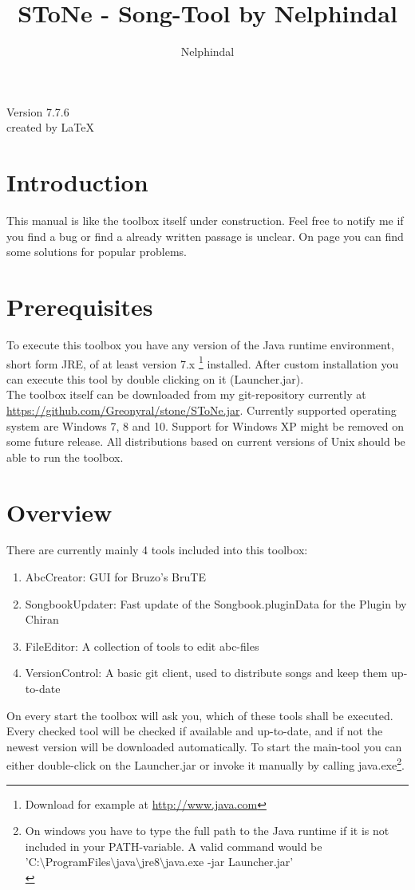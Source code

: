 \documentclass[10pt,a4paper,oneside]{article}
\author{Nelphindal}
\title{SToNe - Song-Tool by Nelphindal}
\begin{document}
\maketitle
Version 7.7.6\\
\vfill
created by \LaTeX
\newpage

\tableofcontents
\newpage

\section{Introduction}
This manual is like the toolbox itself under construction. Feel free to notify me if you find a bug or find a already written passage is unclear. On page \pageref{Trouble} you can find some solutions for popular problems.

\section{Prerequisites}
\label{Preq}
To execute this toolbox you have any version of the Java runtime environment, short form JRE, of at least version 7.x \footnote{Download for example at \url{http://www.java.com}} installed. After custom installation you can execute this tool by double clicking on it (Launcher.jar). \\
The toolbox itself can be downloaded from my git-repository
currently at \url{https://github.com/Greonyral/stone/SToNe.jar}.
Currently supported operating system are Windows 7, 8 and 10. Support for Windows XP might be removed on some future release. All distributions based on current versions of Unix should be able to run the toolbox.

\newpage
\section{Overview}
There are currently mainly 4 tools included into this toolbox:
\begin{enumerate}
\item AbcCreator: GUI for Bruzo's BruTE
\item SongbookUpdater: Fast update of the Songbook.pluginData for the Plugin by Chiran
\item FileEditor: A collection of tools to edit abc-files
\item VersionControl: A basic git client, used to distribute songs and keep them up-to-date
\end{enumerate}
On every start the toolbox will ask you, which of these tools shall be executed. %
Every checked tool will be checked if available and up-to-date, and if not the newest version will be downloaded automatically. To start the main-tool you can either double-click on the Launcher.jar or invoke it manually by calling java.exe\footnote{On windows you have to type the full path to the Java runtime if it is not included in your PATH-variable. A valid command would be\\
'C:$\setminus$ProgramFiles$\setminus$java$\setminus$jre8$\setminus$java.exe -jar Launcher.jar'\\
}.
\end{document}

